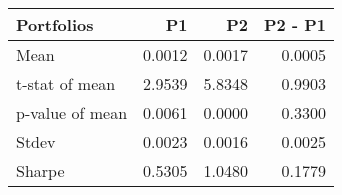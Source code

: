 \begin{tabular}{lrrr}
\toprule
Portfolios & P1 & P2 & P2 - P1 \\
\midrule
Mean & 0.0012 & 0.0017 & 0.0005 \\
t-stat of mean & 2.9539 & 5.8348 & 0.9903 \\
p-value of mean & 0.0061 & 0.0000 & 0.3300 \\
Stdev & 0.0023 & 0.0016 & 0.0025 \\
Sharpe & 0.5305 & 1.0480 & 0.1779 \\
\bottomrule
\end{tabular}
